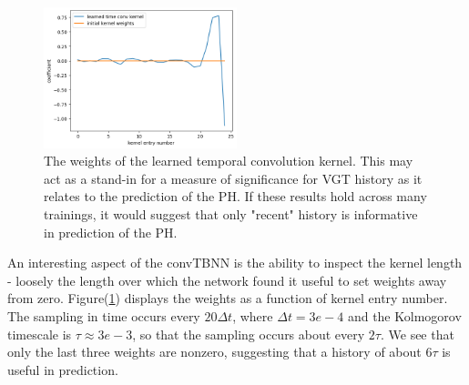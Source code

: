 \begin{figure}
    \centering
    \includegraphics[width=0.5\textwidth]{LagrangianDeformationModels/figs/temporal_conv_kernel.png}
    \caption{The weights of the learned temporal convolution kernel. This may act as a stand-in for a measure of significance for VGT history as it relates to the prediction of the PH. If these results hold across many trainings, it would suggest that only "recent" history is informative in prediction of the PH.}
    \label{fig:conv_kernel}
\end{figure}
An interesting aspect of the convTBNN is the ability to inspect the kernel length - loosely the length over which the network found it useful to set weights away from zero. Figure(\ref{fig:conv_kernel}) displays the weights as a function of kernel entry number. The sampling in time occurs every $20\Delta t$, where $\Delta t = 3e-4$ and the Kolmogorov timescale is $\tau \approx 3e-3$, so that the sampling occurs about every $2\tau$. We see that only the last three weights are nonzero, suggesting that a history of about $6\tau$ is useful in prediction.